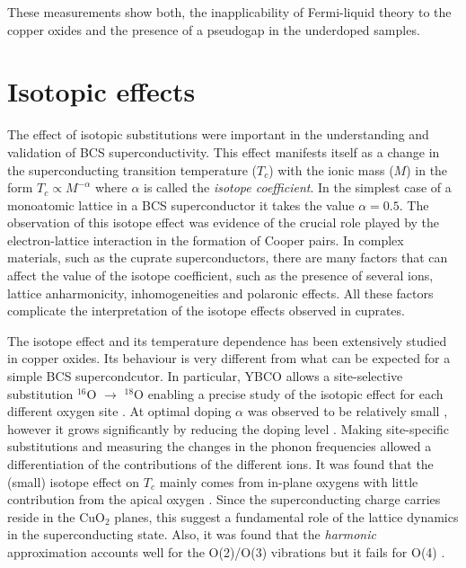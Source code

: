 These measurements show both, the inapplicability of Fermi-liquid theory to the copper oxides and the presence of a pseudogap in the underdoped samples.

\section{Isotopic effects}
\label{sec:isotopic_effects}

The effect of isotopic substitutions were important in the understanding and validation of BCS superconductivity.
This effect manifests itself as a change in the superconducting transition temperature ($T_c$) with the ionic mass ($M$) in the form $T_c \propto M^{-\alpha}$ where $\alpha$ is called the \textit{isotope coefficient}.
In the simplest case of a monoatomic lattice in a BCS superconductor it takes the value $\alpha=0.5$.
The observation of this isotope effect \cite{Reynolds1950,Maxwell1950} was evidence of the crucial role played by the electron-lattice interaction in the formation of Cooper pairs. 
In complex materials, such as the cuprate superconductors, there are many factors that can affect the value of the isotope coefficient, such as the presence of several ions, lattice anharmonicity, inhomogeneities and polaronic effects.
All these factors complicate the interpretation of the isotope effects observed in cuprates.

The isotope effect and its temperature dependence has been extensively studied in copper oxides.
Its behaviour is very different from what can be expected for a simple BCS supercondcutor.
In particular, YBCO allows a site-selective substitution $^{16}$O $\rightarrow$ $^{18}$O enabling a precise study of the isotopic effect for each different oxygen site \cite{Conder1993,Cardona1988}. 
At optimal doping $\alpha$ was observed to be relatively small \cite{Thomsen1988}, however it grows significantly by reducing the doping level \cite{Bishop2007}.
Making site-specific substitutions and measuring the changes in the phonon frequencies  allowed a differentiation of the contributions of the different ions.
It was found that the (small) isotope effect on $T_c$ mainly comes from in-plane oxygens with little contribution from the apical oxygen  \cite{Ruani1994,Zech1994}.
Since the superconducting charge carries reside in the CuO$_2$ planes, this suggest a fundamental role of the lattice dynamics in the superconducting state.
Also, it was found that the \textit{harmonic} approximation accounts well for the O(2)/O(3) vibrations but it fails for O(4) \cite{Ruani1994}.

